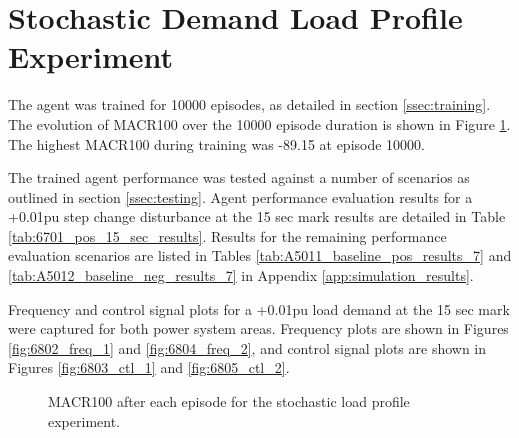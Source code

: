 \section{Stochastic Demand Load Profile Experiment}
The agent was trained for 10000 episodes, as detailed in section \ref{ssec:training}. The evolution of MACR100 over the 10000 episode duration is shown in Figure \ref{fig:6801_average_reward}. The highest MACR100 during training was -89.15 at episode 10000.

The trained agent performance was tested against a number of scenarios as outlined in section \ref{ssec:testing}. Agent performance evaluation results for a +0.01pu step change disturbance at the 15 sec mark results are detailed in Table \ref{tab:6701_pos_15_sec_results}. Results for the remaining performance evaluation scenarios are listed in Tables \ref{tab:A5011_baseline_pos_results_7} and \ref{tab:A5012_baseline_neg_results_7} in Appendix \ref{app:simulation_results}. 

Frequency and control signal plots for a +0.01pu load demand at the 15 sec mark were captured for both power system areas. Frequency plots are shown in Figures \ref{fig:6802_freq_1} and \ref{fig:6804_freq_2}, and control signal plots are shown in Figures \ref{fig:6803_ctl_1} and \ref{fig:6805_ctl_2}.

\begin{figure}[h]
	\centering
	
	\caption{MACR100 after each episode for the stochastic load profile experiment.}\label{fig:6801_average_reward}
\end{figure}



